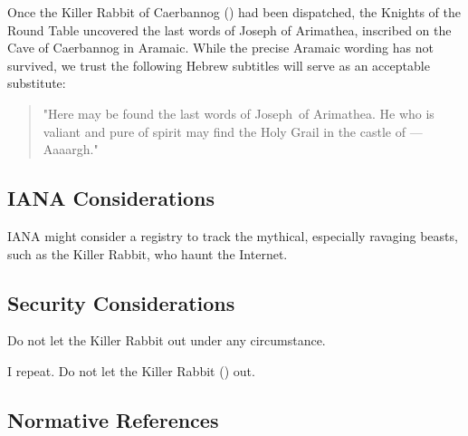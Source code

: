 \documentclass{metanorma}
\begin{document}
Once the Killer Rabbit of Caerbannog () had been
dispatched, the Knights of the Round Table uncovered the last
words of Joseph of Arimathea, inscribed on the Cave of Caerbannog
in Aramaic.  While the precise Aramaic wording has not survived,
we trust the following Hebrew subtitles will serve as an
acceptable substitute:


\begin{quote}

"Here may be found the last words of Joseph~of Arimathea.
He who is valiant and pure of spirit may find the Holy Grail
in the castle of --- Aaaargh."
\end{quote}



\subsection{IANA Considerations}

IANA might consider a registry to track the mythical, especially
ravaging beasts, such as the Killer Rabbit, who haunt the Internet.


\subsection{Security Considerations}

Do not let the Killer Rabbit out under any circumstance.

I repeat. Do not let the Killer Rabbit () out.



\subsection{Normative References}
\begin{thebibliography}{1}
\end{thebibliography}
\end{document}
